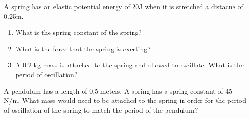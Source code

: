 \documentclass[11pt]{examdesign}
\begin{document}
\begin{shortanswer}[title={Free Response}, rearrange=no]
	

	\begin{question} 
	A spring has an elastic potential energy of 20J when it is stretched a distacne of 0.25m.  
	\begin{enumerate}
		\item What is the spring constant of the spring?
		\vspace{1in}
		\item What is the force that the spring is exerting?
		\vspace{1 in}
		\item A 0.2 kg mass is attached to the spring and allowed to oscillate.  What is the period of oscillation?
		\vspace{1in}
	\end{enumerate}



	\end{question}


\begin{question}
A pendulum has a length of 0.5 meters.  A spring has a spring constant of 45 N/m.  What mass would need to be attached to the spring in order for the period of oscillation of the spring to match the period of the pendulum? 




\end{question}

	
\end{shortanswer}
\end{document}
